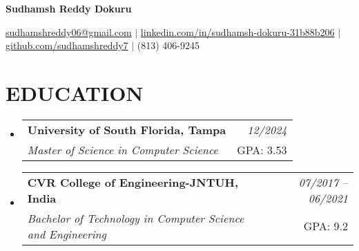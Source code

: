 \documentclass[letterpaper,11pt]{article}
\makeatletter
\newcommand{\resumeEdu}[4]{
\vspace{0mm}\item[]
    \begin{tabular*}{\textwidth}[t]{l@{\extracolsep{\fill}}r}
        \hspace{-4.3mm} \small\textbf{#1} & \hspace{-50mm} \footnotesize{#3}\vspace{-1mm} \\
        \hspace{-4.3mm} \footnotesize{#2} & \hspace{-50mm} \footnotesize{#4}\vspace{-1mm} \\
    \end{tabular*}
    \vspace{-3.2mm}
}
\newcommand{\resumeSubHeadingListStart}{\begin{itemize}[leftmargin=*,labelsep=0mm,itemsep=-2.5mm]}
\newcommand{\resumeItemListStart}{\begin{justify}\begin{itemize}[leftmargin=3ex, rightmargin=2ex, noitemsep,labelsep=1.2mm,itemsep=0mm]\small}
\newcommand{\resumeSubHeadingListEnd}{\end{itemize}\vspace{-2mm}}
\newcommand{\resumeItemListEnd}{\end{itemize}\end{justify}\vspace{-1.5mm}}
\newcommand{\name}{Sudhamsh Reddy Dokuru} %
\newcommand{\phone}{(813) 406-9245} %
\newcommand{\emaila}{sudhamshreddy06@gmail.com} %
\newcommand{\linkedin}{sudhamsh-dokuru-31b88b206} %
\makeatother
\begin{document}
\selectfont


\begin{center}
    \LARGE{\normalfont \textbf{\name}}
\end{center}
\vspace{-4.0mm}
\begin{center}
    \small{\href{mailto:\emaila}{\emaila} \hspace{1mm} $|$ \hspace{1mm} \href{https://www.linkedin.com/in/\linkedin/}{linkedin.com/in/\linkedin} \hspace{1mm} $|$ \hspace{1mm} \href{https://github.com/sudhamshreddy7?tab=repositories}{github.com/sudhamshreddy7} \hspace{1mm} $|$ \hspace{1mm} \phone }
\end{center}
\vspace{-3mm}



\vspace{-2.5mm}
\section{EDUCATION}

\resumeSubHeadingListStart
\resumeEdu
{\normalfont \textbf{University of South Florida, Tampa}} 
{\normalfont \textit{Master of Science in Computer Science}} 
{\normalfont  \textit{12/2024}} %
{GPA: 3.53}
\resumeSubHeadingListEnd
\vspace{-2.0mm}

\resumeSubHeadingListStart
\resumeEdu
{\normalfont \textbf{CVR College of Engineering-JNTUH, India}} 
{\normalfont \textit{Bachelor of Technology in Computer Science and Engineering}} 
{\normalfont \textit{07/2017 -- 06/2021}} %
{GPA: 9.2}
\resumeSubHeadingListEnd
\vspace{-3.0mm}

\end{document}
